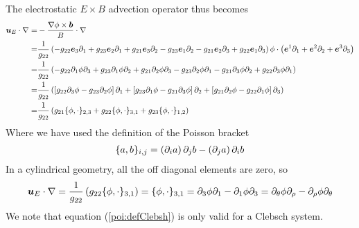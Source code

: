 %
The electrostatic $E\times B$ advection operator thus becomes
%
\begin{align*}
    \boldsymbol{u}_E\cdot\nabla
    =& -\frac{\nabla\phi\times\boldsymbol{b}}{B}\cdot\nabla\\
    =&\frac{1}{g_{22}}
           \left(
           - g_{22}\boldsymbol{e}_3\partial_1
           + g_{23}\boldsymbol{e}_2\partial_1
           + g_{21}\boldsymbol{e}_3\partial_2
           - g_{23}\boldsymbol{e}_1\partial_2
           - g_{21}\boldsymbol{e}_2\partial_3
           + g_{22}\boldsymbol{e}_1\partial_3
           \right)
           \phi
       \cdot\left(\boldsymbol{e}^1\partial_1 + \boldsymbol{e}^2\partial_2 + \boldsymbol{e}^3\partial_3\right)\\
    =& \frac{1}{g_{22}}
           \left(
           - g_{22}\partial_1\phi\partial_3
           + g_{23}\partial_1\phi\partial_2
           + g_{21}\partial_2\phi\partial_3
           - g_{23}\partial_2\phi\partial_1
           - g_{21}\partial_3\phi\partial_2
           + g_{22}\partial_3\phi\partial_1
           \right)\\
    =& \frac{1}{g_{22}}
           \left(
             \left[
               g_{22}\partial_3\phi
             - g_{23}\partial_2\phi
             \right]\partial_1
           +
             \left[
               g_{23}\partial_1\phi
             - g_{21}\partial_3\phi
             \right]\partial_2
           +
             \left[
               g_{21}\partial_2\phi
             - g_{22}\partial_1\phi
             \right]\partial_3
           \right)\\
    =& \frac{1}{g_{22}}
               \left(
                 g_{21}\{\phi, \cdot\}_{2,3}
                 +
                 g_{22}\{\phi, \cdot\}_{3,1}
                 +
                 g_{23}\{\phi, \cdot\}_{1,2}
               \right)
\end{align*}
%
Where we have used the definition of the Poisson bracket
%
\begin{align*}
    \{a, b\}_{i,j} =
      \left(\partial_i a\right) \partial_j b
    - \left(\partial_j a\right) \partial_i b
\end{align*}
%
In a cylindrical geometry, all the off diagonal elements are zero, so
%
\begin{align}
    \boldsymbol{u}_E\cdot\nabla
    = \frac{1}{g_{22}} \left( g_{22}\{\phi, \cdot\}_{3,1} \right)
    = \{\phi, \cdot\}_{3,1}
    = \partial_3\phi\partial_1 - \partial_1\phi\partial_3
    = \partial_\theta\phi\partial_\rho - \partial_\rho\phi\partial_\theta
    \label{poi:defClebsh}
\end{align}
%
We note that equation (\ref{poi:defClebsh}) is only valid for a Clebsch system.
